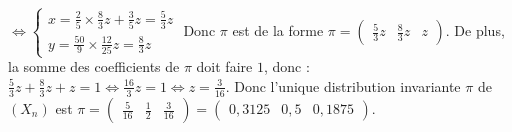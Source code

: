 \begin{tip}[Exemple]
		\newline
		$\iff \begin{cases} x = \frac{2}{5} \times \frac{8}{3} z + \frac{3}{5}z = \frac{5}{3}z \\ y = \frac{50}{9} \times \frac{12}{25}z = \frac{8}{3}z \end{cases}$
		\newpar
		Donc $\pi$ est de la forme $\pi = \begin{pmatrix} \frac{5}{3}z & \frac{8}{3}z & z \end{pmatrix}$. De plus, la somme des coefficients de $\pi$ doit faire $1$, donc :
		\newpar
		$\frac{5}{3}z + \frac{8}{3}z + z = 1 \iff \frac{16}{3}z = 1 \iff z = \frac{3}{16}$.
		\newpar
		Donc l'unique distribution invariante $\pi$ de $(X_n)$ est
		\newline
		$\pi = \begin{pmatrix} \frac{5}{16} & \frac{1}{2} & \frac{3}{16} \end{pmatrix} = \begin{pmatrix} 0,3125 & 0,5 & 0,1875 \end{pmatrix}$.
	\end{tip}
